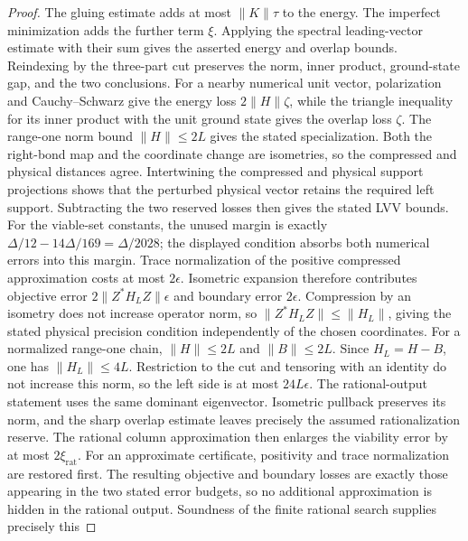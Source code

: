 \begin{proof}
    \leanok
    The gluing estimate adds at most $\lVert K\rVert\tau$ to the energy.
    The imperfect minimization adds the further term $\xi$.  Applying the
    spectral leading-vector estimate with their sum gives the asserted
    energy and overlap bounds.  Reindexing by the three-part cut preserves
    the norm, inner product, ground-state gap, and the two conclusions.  For
    a nearby numerical unit vector, polarization and Cauchy--Schwarz give
    the energy loss $2\lVert H\rVert\zeta$, while the triangle inequality
    for its inner product with the unit ground state gives the overlap loss
    $\zeta$.  The range-one norm bound $\lVert H\rVert\le2L$ gives the
    stated specialization.  Both the right-bond map and the coordinate
    change are isometries, so the compressed and physical distances agree.
    Intertwining the compressed and physical support projections shows that
    the perturbed physical vector retains the required left support.
    Subtracting the two reserved losses then gives the stated LVV bounds.
    For
    the viable-set constants, the unused margin is exactly
    $\Delta/12-14\Delta/169=\Delta/2028$; the displayed condition absorbs
    both numerical errors into this margin.  Trace normalization of the
    positive compressed approximation costs at most $2\epsilon$.  Isometric
    expansion therefore contributes objective error
    $2\lVert Z^*H_LZ\rVert\epsilon$ and boundary error $2\epsilon$.
    Compression by an isometry does not increase operator norm, so
    $\lVert Z^*H_LZ\rVert\le\lVert H_L\rVert$, giving the stated physical
    precision condition independently of the chosen coordinates.  For a
    normalized range-one chain, $\lVert H\rVert\le2L$ and
    $\lVert B\rVert\le2L$.  Since $H_L=H-B$, one has
    $\lVert H_L\rVert\le4L$.  Restriction to the cut and tensoring with an
    identity do not increase this norm, so the left side is at most
    $24L\epsilon$.
    The rational-output statement uses the same dominant eigenvector.
    Isometric pullback preserves its norm, and the sharp overlap estimate
    leaves precisely the assumed rationalization reserve.  The rational
    column approximation then enlarges the viability error by at most
    \(2\xi_{\mathrm{rat}}\).
    For an approximate certificate, positivity and trace normalization are
    restored first.  The resulting objective and boundary losses are exactly
    those appearing in the two stated error budgets, so no additional
    approximation is hidden in the rational output.
    Soundness of the finite rational search supplies precisely this

\end{proof}
